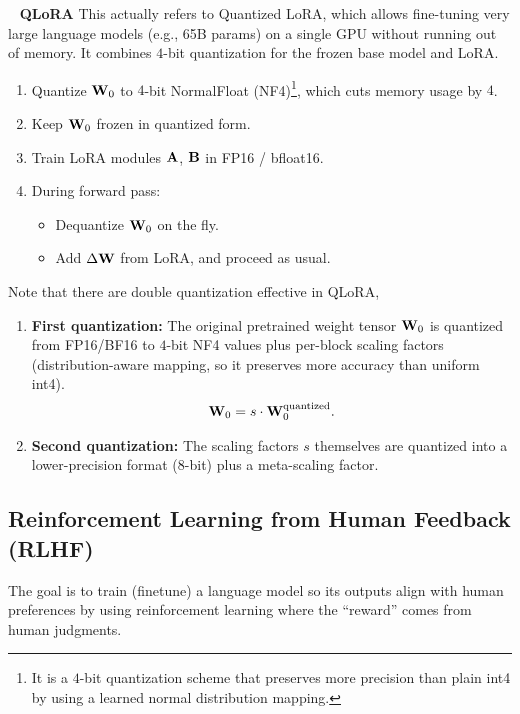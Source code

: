 \documentclass[11pt]{article}  %
\begin{document}
\textbullet~ \textbf{QLoRA}
This actually refers to Quantized LoRA, which allows fine-tuning very large language models (e.g., 65B params) on a single GPU without running out of memory.
It combines $4$-bit quantization for the frozen base model and LoRA.

\begin{enumerate}
  \item Quantize $\mathbf{W}_0$ to $4$-bit NormalFloat (NF4)\footnote{It is a $4$-bit quantization scheme that preserves more precision than plain int4 by using a learned normal distribution mapping.}, which cuts memory usage by $4$.
  \item Keep $\mathbf{W}_0$ frozen in quantized form.
  \item Train LoRA modules $\mathbf{A}$, $\mathbf{B}$ in FP16 / bfloat16.
  \item During forward pass: \begin{itemize}
    \item Dequantize $\mathbf{W}_0$ on the fly.
    \item Add $\Delta \mathbf{W}$ from LoRA, and proceed as usual.
  \end{itemize}
\end{enumerate}

Note that there are double quantization effective in QLoRA, 
\begin{enumerate}
  \item \textbf{First quantization:} The original pretrained weight tensor $\mathbf{W}_0$ is quantized from FP16/BF16 to $4$-bit NF4 values plus per-block scaling factors (distribution-aware mapping, so it preserves more accuracy than uniform int4).
  \begin{align*}
    \mathbf{W}_0 = s \cdot \mathbf{W}_0^{\text{quantized}}. 
  \end{align*}
  
  \item \textbf{Second quantization:} The scaling factors $s$ themselves are quantized into a lower-precision format (8-bit) plus a meta-scaling factor.
\end{enumerate}



\subsection{Reinforcement Learning from Human Feedback (RLHF)}
The goal is to train (finetune) a language model so its outputs align with human preferences by using reinforcement learning where the “reward” comes from human judgments.
\end{document}
